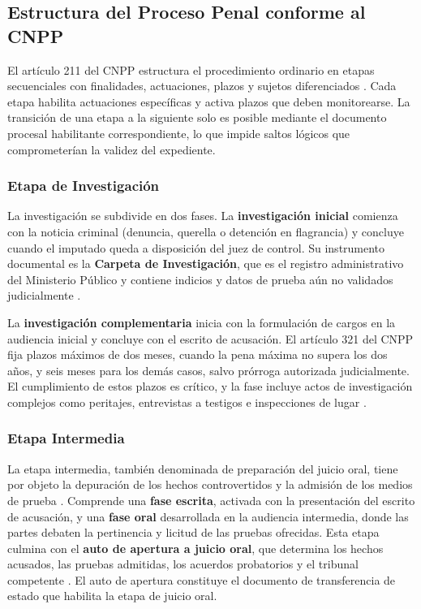 \subsection{Estructura del Proceso Penal conforme al CNPP}\label{sec:estructura-proceso}

El artículo 211 del CNPP estructura el procedimiento ordinario en etapas secuenciales con finalidades, actuaciones, plazos y sujetos diferenciados \cite{cnpp2021}. Cada etapa habilita actuaciones específicas y activa plazos que deben monitorearse. La transición de una etapa a la siguiente solo es posible mediante el documento procesal habilitante correspondiente, lo que impide saltos lógicos que comprometerían la validez del expediente.

\subsubsection{Etapa de Investigación}

La investigación se subdivide en dos fases. La \textbf{investigación inicial} comienza con la noticia criminal (denuncia, querella o detención en flagrancia) y concluye cuando el imputado queda a disposición del juez de control. Su instrumento documental es la \textbf{Carpeta de Investigación}, que es el registro administrativo del Ministerio Público y contiene indicios y datos de prueba aún no validados judicialmente \cite{cnpp2021,garciaramirez2015}.

La \textbf{investigación complementaria} inicia con la formulación de cargos en la audiencia inicial y concluye con el escrito de acusación. El artículo 321 del CNPP fija plazos máximos de dos meses, cuando la pena máxima no supera los dos años, y seis meses para los demás casos, salvo prórroga autorizada judicialmente. El cumplimiento de estos plazos es crítico, y la fase incluye actos de investigación complejos como peritajes, entrevistas a testigos e inspecciones de lugar \cite{cnpp2021,garciaramirez2015}.

\subsubsection{Etapa Intermedia}

La etapa intermedia, también denominada de preparación del juicio oral, tiene por objeto la depuración de los hechos controvertidos y la admisión de los medios de prueba \cite{cnpp2021}. Comprende una \textbf{fase escrita}, activada con la presentación del escrito de acusación, y una \textbf{fase oral} desarrollada en la audiencia intermedia, donde las partes debaten la pertinencia y licitud de las pruebas ofrecidas. Esta etapa culmina con el \textbf{auto de apertura a juicio oral}, que determina los hechos acusados, las pruebas admitidas, los acuerdos probatorios y el tribunal competente \cite{cnpp2021}. El auto de apertura constituye el documento de transferencia de estado que habilita la etapa de juicio oral.

